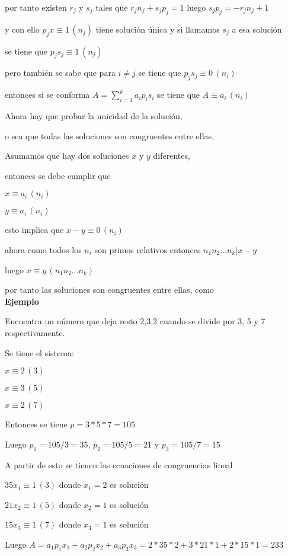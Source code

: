 \documentclass[a4paper,12pt]{report}
\begin{document}
por tanto existen $r_j$ y $s_j$ tales que $r_j n_j + s_j p_j=1$ luego $s_j p_j=-r_j n_j +1$

y con ello $p_jx\equiv 1\, (n_j)$ tiene solución única y si llamamos $s_j$ a esa solución 

se tiene que $p_j s_j\equiv 1\, (n_j)$

pero también se sabe que para $i\neq j$ se tiene que  $p_js_j\equiv 0\, (n_i)$

entonces si se conforma $A=\sum_{i=1}^k a_ip_is_i$ se tiene que $A\equiv a_i \, (n_i)$


Ahora hay que probar la unicidad de la solución, 

o sea que todas las soluciones son congruentes entre ellas. 

Asumamos que hay dos soluciones $x$ y $y$ diferentes,  

entonces se debe cumplir que

$x\equiv a_i\, (n_i)$

$y\equiv a_i\, (n_i)$

esto implica que $x-y\equiv 0\, (n_i)$

ahora como todos los $n_i$ son primos relativos entonces $n_1 n_2\dots n_k | x-y$

luego $x\equiv y\, (n_1 n_2\dots n_k)$ 

por tanto las soluciones son congruentes entre ellas, como\\

\textbf{Ejemplo}

Encuentra un número que deja resto 2,3,2 cuando se divide por 3, 5 y 7 respectivamente.

Se tiene el sistema:

$x\equiv 2 \, (3)$

$x\equiv 3 \, (5)$

$x\equiv 2 \, (7)$

Entonces se tiene $p=3*5*7=105$

Luego $p_1=105/3=35$, $p_2=105/5=21$ y $p_3=105/7=15$

A partir de esto se tienen las ecuaciones de congruencias lineal

$35x_1\equiv 1 \, (3)$ donde $x_1=2$ es solución

$21x_2\equiv 1 \, (5)$ donde $x_2=1$ es solución

$15x_3\equiv 1 \, (7)$ donde $x_3=1$ es solución

Luego $A=a_1 p_1 x_1 + a_2 p_2 x_2 + a_3 p_3 x_3 = 2*35*2 + 3*21*1 + 2*15*1 = 233$
\end{document}
